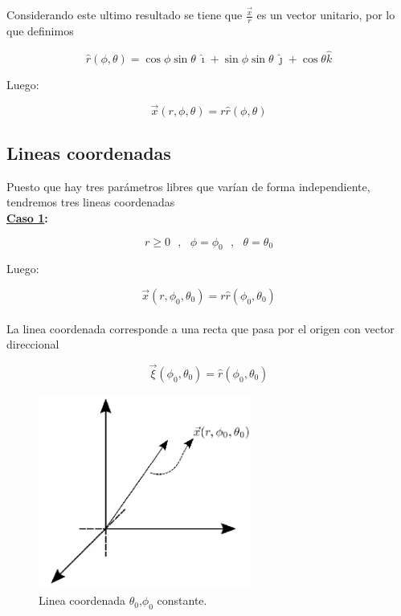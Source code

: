 \documentclass[12pt]{report}
\begin{document}
Considerando este ultimo resultado se tiene que $\displaystyle \frac{\vec{x}}{r}$ es un vector unitario, por lo que definimos

\begin{equation}\label{2.13}
\hat{r}(\phi,\theta)=\cos{\phi}\sin{\theta} \ \hat{\imath} + \sin{\phi}\sin{\theta} \ \hat{\jmath} + \cos{\theta} \hat{k}
\end{equation}

Luego:

\begin{equation}\label{2.14}
\vec{x}(r,\phi,\theta)=r\hat{r}(\phi,\theta)
\end{equation}









\subsection{Lineas coordenadas}

Puesto que hay tres parámetros libres que varían de forma independiente, tendremos tres lineas coordenadas\\

\textbf{\underline{Caso 1}:}

\begin{equation}\nonumber
r \geq 0 \ \ \ , \ \ \ \phi=\phi_0 \ \ \ , \ \ \ \theta=\theta_0 
\end{equation}

Luego:

\begin{equation}
\vec{x}(r,\phi_0,\theta_0)=r\hat{r}(\phi_0,\theta_0)
\end{equation}
\\
La linea coordenada corresponde a una recta que pasa por el origen  con vector direccional 

\begin{equation}
\vec{\xi}(\phi_0,\theta_0)= \hat{r}(\phi_0,\theta_0) %
\end{equation}


\begin{figure}[H]
	\centering
	\includegraphics[width=7cm]{figura321.png}
	\caption{ Linea coordenada $\theta_0$,$\phi_0$ constante.}
	\label{fig.1}
\end{figure}
\end{document}

